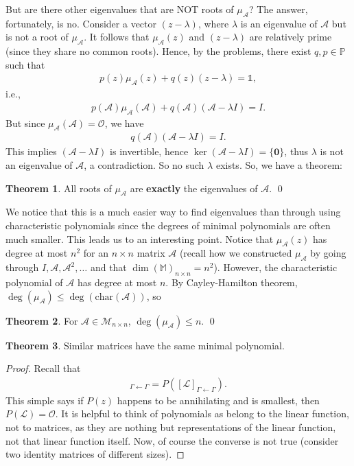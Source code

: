 \documentclass{article}
\theoremstyle{definition}
\newtheorem{thm}{Theorem}[section]
\newcommand{\A}{\mathcal{A}}
\newcommand{\lag}{\mathcal{L}}
\newcommand{\M}{\mathcal{M}}
\begin{document}
But are there other eigenvalues that are NOT roots of $\mu_\A$? The answer, fortunately, is no. Consider a vector $(z - \lambda)$, where $\lambda$ is an eigenvalue of $\A$ but is not a root of $\mu_\A$. It follows that $\mu_\A(z)$ and $(z- \lambda)$ are relatively prime (since they share no common roots). Hence, by the problems, there exist $q,p\in \mathbb{P}$ such that 
\begin{align*}
p(z)\mu_\A(z) + q(z)(z-\lambda) = \mathbb{1}, 
\end{align*}
i.e.,
\begin{align*}
p(\A)\mu_\A(\A) + q(\A)(\A-\lambda I) = I.
\end{align*}
But since $\mu_{\A}(\A) = \mathcal{O}$, we have
\begin{align*}
q(\A)(\A-\lambda I) = I.
\end{align*}
This implies $(\A-\lambda I)$ is invertible, hence $\ker(\A - \lambda I) = \{ \mathbf{0} \}$, thus $\lambda$ is not an eigenvalue of $\A$, a contradiction. So no such $\lambda$ exists. So, we have a theorem:

\begin{thm}
	All roots of $\mu_\A$ are \textbf{exactly} the eigenvalues of $\A$. \qed
\end{thm}

We notice that this is a much easier way to find eigenvalues than through using characteristic polynomials since the degrees of minimal polynomials are often much smaller. This leads us to an interesting point. Notice that $\mu_\A(z)$ has degree at most $n^2$ for an $n\times n$ matrix $\A$ (recall how we constructed $\mu_\A$ by going through $I,\A,\A^2,\dots$ and that $\dim(\mathbb{M})_{n\times n} = n^2$). However, the characteristic polynomial of $\A$ has degree at most $n$. By Cayley-Hamilton theorem, $\deg(\mu_\A) \leq \deg(\text{char} (\A))$, so

\begin{thm}
	For $\A \in \M_{n\times n}$, $\deg(\mu_\A) \leq n$. \qed 
\end{thm}


\begin{thm}
	Similar matrices have the same minimal polynomial.
	
	\begin{proof}
		Recall that 
		\begin{align*}
		[P(\lag)]_{\Gamma\leftarrow\Gamma} = P\left([\lag]_{\Gamma\leftarrow\Gamma}\right).
		\end{align*}
		This simple says if $P(z)$ happens to be annihilating and is smallest, then $P(\lag) = \mathcal{O}$. It is helpful to think of polynomials as belong to the linear function, not to matrices, as they are nothing but representations of the linear function, not that linear function itself. Now, of course the converse is not true (consider two identity matrices of different sizes).
	\end{proof}
\end{thm}
\end{document}
